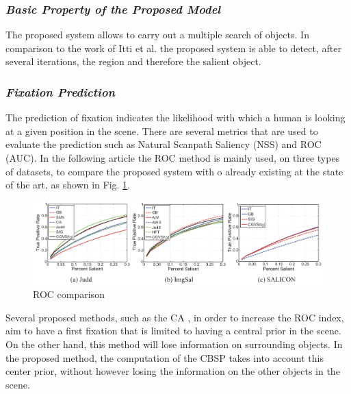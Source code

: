 \subsubsection{\emph{Basic Property of the Proposed Model}}
The proposed system allows to carry out a multiple search of objects. In 
comparison to the work of Itti et al. \cite{0747815505} the proposed system is able to detect, 
after several iterations, the region and therefore the salient object.

\subsubsection{\emph{Fixation Prediction}}
The prediction of fixation indicates the likelihood with which a human is 
looking at a given position in the scene. There are several metrics that are 
used to evaluate the prediction such as Natural Scanpath Saliency (NSS) 
and ROC (AUC). In the following article the ROC method is mainly used, 
on three types of datasets, to compare the proposed system with o already 
existing at the state of the art, as shown in Fig. \ref{fig: ROC}.
\begin{figure}[htbp]
    \centering
    \includegraphics[width = 1 \linewidth]{images/paper1/ROC.png}
    \centering
    \caption{ROC comparison}
    \label{fig: ROC}
\end{figure}

Several proposed methods, such as the CA \cite{0747815502}, in order to increase the ROC 
index, aim to have a first fixation that is limited to having a central prior 
in the scene. On the other hand, this method will lose information on surrounding 
objects. In the proposed method, the computation of the CBSP 
takes into account this center prior, without however losing the information 
on the other objects in the scene.

